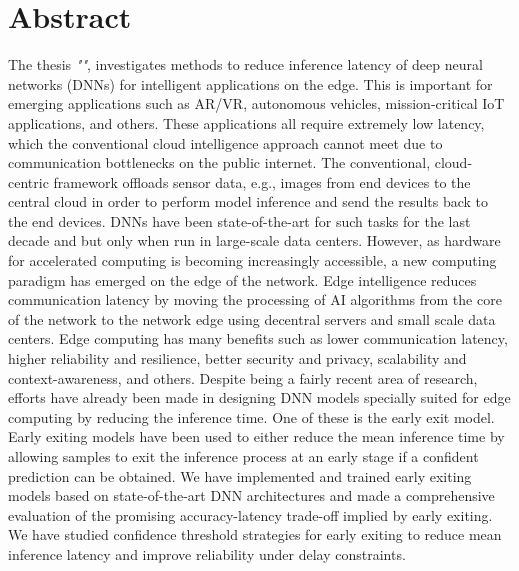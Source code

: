 
    \hypertarget{abstract}{%
    \chapter*{Abstract}\label{sec:abstract}}
\begin{justify}
	\begin{small}
		{\textcolor{caption-color}{The thesis \textit{"\thetitle"}, investigates methods to reduce inference latency of deep neural networks (DNNs) for intelligent applications on the edge. This is important for emerging applications such as AR/VR, autonomous vehicles, mission-critical IoT applications, and others. These applications all require extremely low latency, which the conventional cloud intelligence approach cannot meet due to communication bottlenecks on the public internet. \newline
		The conventional, cloud-centric framework offloads sensor data, e.g., images from end devices to the central cloud in order to perform model inference and send the results back to the end devices. DNNs have been state-of-the-art for such tasks for the last decade and but only when run in large-scale data centers. However, as hardware for accelerated computing is becoming increasingly accessible, a new computing paradigm has emerged on the edge of the network.
		\newline Edge intelligence reduces communication latency by moving the processing of AI algorithms from the core of the network to the network edge using decentral servers and small scale data centers. Edge computing has many benefits such as lower communication latency, higher reliability and resilience, better security and privacy, scalability and context-awareness, and others. Despite being a fairly recent area of research, efforts have already been made in designing DNN models specially suited for edge computing by reducing the inference time. One of these is the early exit model. 
		\newline Early exiting models have been used to either reduce the mean inference time by allowing samples to exit the inference process at an early stage if a confident prediction can be obtained. We have implemented and trained early exiting models based on state-of-the-art DNN architectures and made a comprehensive evaluation of the promising accuracy-latency trade-off implied by early exiting. We have studied confidence threshold strategies for early exiting to reduce mean inference latency and improve reliability under delay constraints. 
		\newline
}}
\end{small}
\end{justify}

